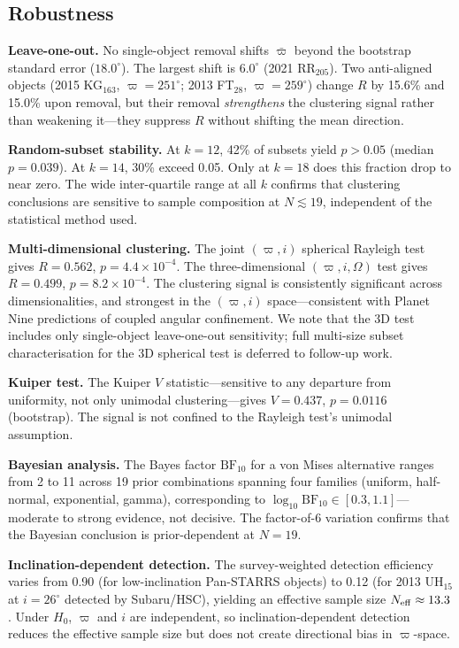 \documentclass[12pt,a4paper]{article}
\begin{document}
\subsection{Robustness}

\textbf{Leave-one-out.} No single-object removal shifts $\bar{\varpi}$ beyond the bootstrap standard error ($18.0^\circ$). The largest shift is $6.0^\circ$ (2021 RR$_{205}$). Two anti-aligned objects (2015 KG$_{163}$, $\varpi=251^\circ$; 2013 FT$_{28}$, $\varpi=259^\circ$) change $R$ by 15.6\% and 15.0\% upon removal, but their removal \textit{strengthens} the clustering signal rather than weakening it---they suppress $R$ without shifting the mean direction.

\textbf{Random-subset stability.} At $k=12$, 42\% of subsets yield $p>0.05$ (median $p=0.039$). At $k=14$, 30\% exceed 0.05. Only at $k=18$ does this fraction drop to near zero. The wide inter-quartile range at all $k$ confirms that clustering conclusions are sensitive to sample composition at $N\lesssim19$, independent of the statistical method used.

\textbf{Multi-dimensional clustering.} The joint $(\varpi, i)$ spherical Rayleigh test gives $R=0.562$, $p=4.4\times10^{-4}$. The three-dimensional $(\varpi, i, \Omega)$ test gives $R=0.499$, $p=8.2\times10^{-4}$. The clustering signal is consistently significant across dimensionalities, and strongest in the $(\varpi, i)$ space---consistent with Planet Nine predictions of coupled angular confinement. We note that the 3D test includes only single-object leave-one-out sensitivity; full multi-size subset characterisation for the 3D spherical test is deferred to follow-up work.

\textbf{Kuiper test.} The Kuiper $V$ statistic---sensitive to any departure from uniformity, not only unimodal clustering---gives $V=0.437$, $p=0.0116$ (bootstrap). The signal is not confined to the Rayleigh test's unimodal assumption.

\textbf{Bayesian analysis.} The Bayes factor $\mathrm{BF}_{10}$ for a von Mises alternative ranges from 2 to 11 across 19 prior combinations spanning four families (uniform, half-normal, exponential, gamma), corresponding to $\log_{10}\mathrm{BF}_{10}\in[0.3,1.1]$---moderate to strong evidence, not decisive. The factor-of-6 variation confirms that the Bayesian conclusion is prior-dependent at $N=19$.

\textbf{Inclination-dependent detection.} The survey-weighted detection efficiency varies from 0.90 (for low-inclination Pan-STARRS objects) to 0.12 (for 2013 UH$_{15}$ at $i=26^\circ$ detected by Subaru/HSC), yielding an effective sample size $N_{\rm eff}\approx13.3$. Under $H_0$, $\varpi$ and $i$ are independent, so inclination-dependent detection reduces the effective sample size but does not create directional bias in $\varpi$-space.
\end{document}
